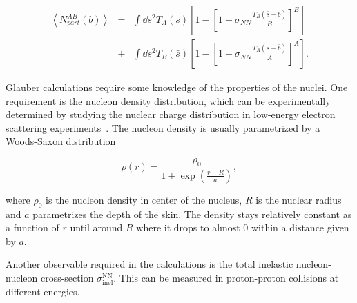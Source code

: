 \begin{eqnarray}
\left<N_{part}^{AB}\left(b\right)\right>&=&\int \dd  s^2 T_A\left(\bar s\right)\left[1-\left[1-\sigma_{NN}\frac{T_B\left(\bar s - \bar b\right)}{B}\right]^B\right] \nonumber \\
 &+ &\int \dd s^2 T_B\left(\bar s\right)\left[1-\left[1-\sigma_{NN}\frac{T_A\left(\bar s - \bar b\right)}{A}\right]^A\right].
\end{eqnarray}

%
%
%
%
%
%
%
%
%
%
%


Glauber calculations require some knowledge of the properties of the nuclei. One requirement is the nucleon density distribution, which can be experimentally determined by studying the nuclear charge distribution in low-energy electron scattering experiments~\cite{Miller:2007ri}.  The nucleon density is usually parametrized by a Woods-Saxon  distribution

%
\begin{equation}
\rho\left(r\right)=\frac{\rho_0}{1+\exp{\left(\frac{r-R}{a}\right)}}
,\end{equation}

\noindent where $\rho_0$ is the nucleon density in center of the nucleus, $R$ is the nuclear radius and $a$ parametrizes the depth of the skin. The density stays relatively constant as a function of $r$ until around $R$ where it drops to almost 0 within a distance given by $a$.

Another observable required in the calculations is the total inelastic nucleon-nucleon cross-section $\sigma\mathrm{^{NN}_{inel}}$.  This can be measured in proton-proton collisions at different energies.

